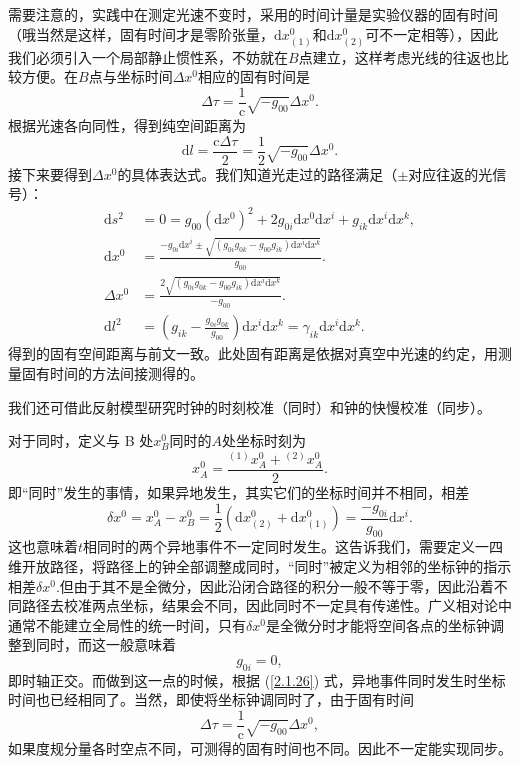 \documentclass[11pt, a4paper, oneside, onecolumn]{ctexart}
\numberwithin{equation}{subsection}
\begin{document}
需要注意的，实践中在测定光速不变时，采用的时间计量是实验仪器的固有时间（哦当然是这样，固有时间才是零阶张量，$\mathrm{d}x^{0}_{\left(1\right)}$和$\mathrm{d}x^{0}_{\left(2\right)}$可不一定相等），因此我们必须引入一个局部静止惯性系，不妨就在$B$点建立，这样考虑光线的往返也比较方便。在$B$点与坐标时间$\Delta{}x^{0}$相应的固有时间是
\begin{equation}
\Delta{}\tau=\frac{1}{\mathrm{c}}\sqrt{-g_{00}}\Delta{}x^{0}.
\end{equation}
根据光速各向同性，得到纯空间距离为
\begin{equation}
\mathrm{d}l=\frac{\mathrm{c}\Delta{}\tau}{2}=\frac12\sqrt{-g_{00}}\Delta{}x^{0}.
\end{equation}
接下来要得到$\Delta{}x^{0}$的具体表达式。我们知道光走过的路径满足（$\pm$对应往返的光信号）：
\begin{align}
\mathrm{d}s^{2}&=0=g_{00}\left(\mathrm{d}x^{0}\right)^{2}+2g_{0i}\mathrm{d}x^{0}\mathrm{d}x^{i}+g_{ik}\mathrm{d}x^{i}\mathrm{d}x^{k},\\
\mathrm{d}x^{0}&=\frac{-g_{0i}\mathrm{d}x^{i}\pm\sqrt{\left(g_{0i}g_{0k}-g_{00}g_{ik}\right)\mathrm{d}x^{i}\mathrm{d}x^{k}}}{g_{00}}.\label{往返}\\
\Delta{}x^{0}&=\frac{2\sqrt{\left(g_{0i}g_{0k}-g_{00}g_{ik}\right)\mathrm{d}x^{i}\mathrm{d}x^{k}}}{-g_{00}}.\\
\mathrm{d}l^{2}&=\left(g_{ik}-\frac{g_{0i}g_{0k}}{g_{00}}\right)\mathrm{d}x^{i}\mathrm{d}x^{k}=\gamma_{ik}\mathrm{d}x^{i}\mathrm{d}x^{k}.
\end{align}
得到的固有空间距离与前文一致。此处固有距离是依据对真空中光速的约定，用测量固有时间的方法间接测得的。

我们还可借此反射模型研究时钟的时刻校准（同时）和钟的快慢校准（同步）。

对于同时，定义与 B 处$x_{B}^{0}$同时的$A$处坐标时刻为
\begin{equation}
x_{A}^{0}=\frac{{}^{\left(1\right)}x_{A}^{0}+{}^{\left(2\right)}x_{A}^{0}}{2}.
\end{equation}
即“同时”发生的事情，如果异地发生，其实它们的坐标时间并不相同，相差
\begin{equation}
\delta{}x^{0}=x_{A}^{0}-x_{B}^{0}=\frac12\left(\mathrm{d}x^{0}_{\left(2\right)}+\mathrm{d}x^{0}_{\left(1\right)}\right)=\frac{-g_{0i}}{g_{00}}\mathrm{d}x^{i}.\label{2.1.26}
\end{equation}
这也意味着$t$相同时的两个异地事件不一定同时发生。这告诉我们，需要定义一四维开放路径，将路径上的钟全部调整成同时，“同时”被定义为相邻的坐标钟的指示相差$\delta{}x^{0}$.但由于其不是全微分，因此沿闭合路径的积分一般不等于零，因此沿着不同路径去校准两点坐标，结果会不同，因此同时不一定具有传递性。广义相对论中通常不能建立全局性的统一时间，只有$\delta{}x^{0}$是全微分时才能将空间各点的坐标钟调整到同时，而这一般意味着
\begin{equation}
g_{0i}=0,
\end{equation}
即时轴正交。而做到这一点的时候，根据 (\ref{2.1.26}) 式，异地事件同时发生时坐标时间也已经相同了。当然，即使将坐标钟调同时了，由于固有时间
\begin{equation}
\Delta{}\tau=\frac{1}{\mathrm{c}}\sqrt{-g_{00}}\Delta{}x^{0},
\end{equation}
如果度规分量各时空点不同，可测得的固有时间也不同。因此不一定能实现同步。
\end{document}

